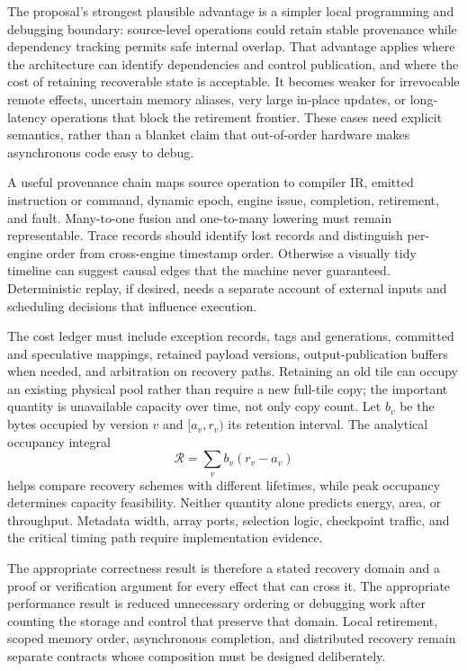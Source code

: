 The proposal's strongest plausible advantage is a simpler local programming and debugging boundary: source-level operations could retain stable provenance while dependency tracking permits safe internal overlap. That advantage applies where the architecture can identify dependencies and control publication, and where the cost of retaining recoverable state is acceptable. It becomes weaker for irrevocable remote effects, uncertain memory aliases, very large in-place updates, or long-latency operations that block the retirement frontier. These cases need explicit semantics, rather than a blanket claim that out-of-order hardware makes asynchronous code easy to debug.

A useful provenance chain maps source operation to compiler IR, emitted instruction or command, dynamic epoch, engine issue, completion, retirement, and fault. Many-to-one fusion and one-to-many lowering must remain representable. Trace records should identify lost records and distinguish per-engine order from cross-engine timestamp order. Otherwise a visually tidy timeline can suggest causal edges that the machine never guaranteed. Deterministic replay, if desired, needs a separate account of external inputs and scheduling decisions that influence execution.

The cost ledger must include exception records, tags and generations, committed and speculative mappings, retained payload versions, output-publication buffers when needed, and arbitration on recovery paths. Retaining an old tile can occupy an existing physical pool rather than require a new full-tile copy; the important quantity is unavailable capacity over time, not only copy count. Let $b_v$ be the bytes occupied by version $v$ and $[a_v,r_v)$ its retention interval. The analytical occupancy integral
\begin{equation}
 \mathcal{R}=\sum_v b_v(r_v-a_v)
\end{equation}
helps compare recovery schemes with different lifetimes, while peak occupancy determines capacity feasibility. Neither quantity alone predicts energy, area, or throughput. Metadata width, array ports, selection logic, checkpoint traffic, and the critical timing path require implementation evidence.

The appropriate correctness result is therefore a stated recovery domain and a proof or verification argument for every effect that can cross it. The appropriate performance result is reduced unnecessary ordering or debugging work after counting the storage and control that preserve that domain. Local retirement, scoped memory order, asynchronous completion, and distributed recovery remain separate contracts whose composition must be designed deliberately.
